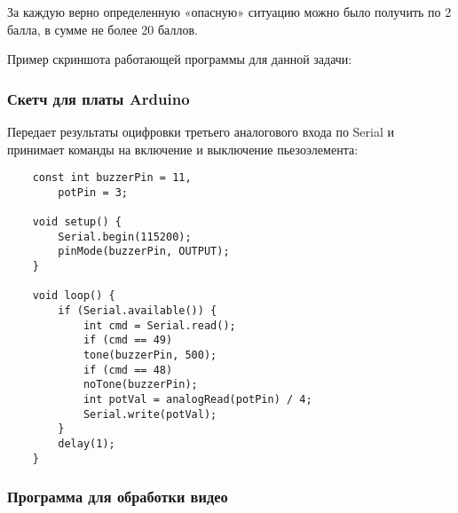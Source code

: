 За каждую верно определенную «опасную» ситуацию можно было получить по 2 балла, в сумме не более 20 баллов.

Пример скриншота работающей программы для данной задачи:


\subsubsection*{Скетч для платы Arduino}

Передает результаты оцифровки третьего аналогового входа по Serial и принимает команды на включение и выключение пьезоэлемента: 

\begin{verbatim}
    const int buzzerPin = 11,
      	potPin = 3;

    void setup() {
        Serial.begin(115200);
        pinMode(buzzerPin, OUTPUT);
    }

    void loop() {
        if (Serial.available()) {
            int cmd = Serial.read();
            if (cmd == 49)
            tone(buzzerPin, 500);
            if (cmd == 48)
            noTone(buzzerPin);
            int potVal = analogRead(potPin) / 4;
            Serial.write(potVal);
        }
        delay(1);
    }
\end{verbatim}

\subsubsection*{Программа для обработки видео}


